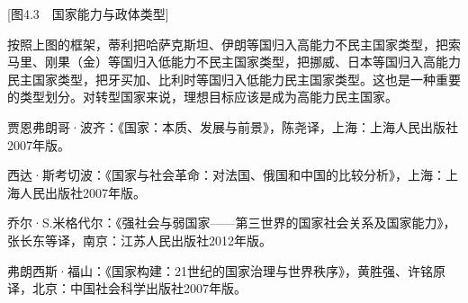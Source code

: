 [图4.3　国家能力与政体类型]

按照上图的框架，蒂利把哈萨克斯坦、伊朗等国归入高能力不民主国家类型，把索马里、刚果（金）等国归入低能力不民主国家类型，把挪威、日本等国归入高能力民主国家类型，把牙买加、比利时等国归入低能力民主国家类型。这也是一种重要的类型划分。对转型国家来说，理想目标应该是成为高能力民主国家。


贾恩弗朗哥·波齐：《国家：本质、发展与前景》，陈尧译，上海：上海人民出版社2007年版。

西达·斯考切波：《国家与社会革命：对法国、俄国和中国的比较分析》，上海：上海人民出版社2007年版。

乔尔·S.米格代尔：《强社会与弱国家——第三世界的国家社会关系及国家能力》，张长东等译，南京：江苏人民出版社2012年版。

弗朗西斯·福山：《国家构建：21世纪的国家治理与世界秩序》，黄胜强、许铭原译，北京：中国社会科学出版社2007年版。

